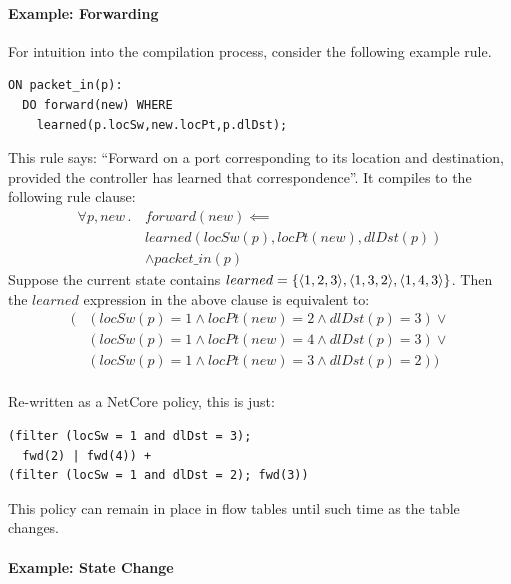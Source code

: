 \paragraph{Example: Forwarding}

For intuition into the compilation process, consider the following example
rule.
\begin{lstlisting}[label=list:comp1]   
ON packet_in(p):
  DO forward(new) WHERE
    learned(p.locSw,new.locPt,p.dlDst);
\end{lstlisting}
This rule says: ``Forward  on a port corresponding to its location and destination, provided the controller has learned that correspondence''. 
It compiles to the following rule clause:\\
\begin{align*} 
\forall p, new \,.\, & forward(new) \impliedby \\ 
                       & learned(locSw(p), locPt(new), dlDst(p)) \\  
                       & \wedge \mathit{packet\_in}(p) 
\end{align*}
Suppose the current state contains $learned = \{
\langle {1,2,3} \rangle, \langle {1,3,2} \rangle, \langle {1,4,3} \rangle \}$. Then the $learned$ expression in the above clause is equivalent to: 
\begin{align*}
(&(locSw(p) = 1 \wedge locPt(new) = 2 \wedge dlDst(p) = 3) \vee  \\
 &(locSw(p) = 1 \wedge locPt(new) = 4 \wedge dlDst(p) = 3) \vee  \\
 &(locSw(p) = 1 \wedge locPt(new) = 3 \wedge dlDst(p) = 2))      \\
\end{align*}

Re-written as a NetCore policy, this is just:
\small
\begin{verbatim}
(filter (locSw = 1 and dlDst = 3); 
  fwd(2) | fwd(4)) +
(filter (locSw = 1 and dlDst = 2); fwd(3))
\end{verbatim}
\normalsize
This policy can remain in place in flow tables until such
time as the  table changes.

\paragraph{Example: State Change}

